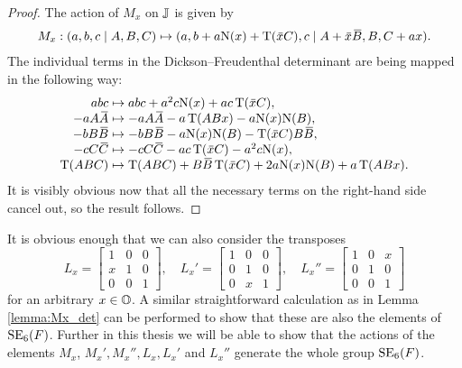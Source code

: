 \begin{proof}
	The action of $M_x$ on $\mathbb{J}$ is given by
	\begin{equation*}
		\begin{array}{r@{\;}c@{\;}l}
		M_x: (a,b,c\mid A,B,C) & \mapsto & (a,b+a\NN(x)+\Tr(\ovx C),c \mid 
										A+\ovx\ovB, B, C+ax).
		\end{array}
	\end{equation*}
	The individual terms in the Dickson--Freudenthal determinant are being mapped in
	the following way:
	\begin{equation*}
		\begin{array}{r@{\;}c@{\;}l}
			abc & \mapsto & abc + a^2c\NN(x) + ac\Tr(\ovx C), \\
			-aA\ovA & \mapsto & -aA\ovA - a\Tr(ABx) - a\NN(x)\NN(B), \\
			-bB\ovB & \mapsto & -bB\ovB - a\NN(x)\NN(B) - \Tr(\ovx C)B\ovB, \\
			-cC\ovC & \mapsto & -cC\ovC - ac\Tr(\ovx C) - a^2c\NN(x), \\
			\Tr(ABC) & \mapsto & \Tr(ABC) + B\ovB\Tr(\ovx C) + 2a\NN(x)\NN(B) + a\Tr(ABx). 
		\end{array}
	\end{equation*}
	It is visibly obvious now that all the necessary terms on the right-hand side cancel out,
	so the result follows.
\end{proof}

It is obvious enough that we can also consider the transposes 
\begin{equation}
	L_x = \begin{bmatrix}
		1 & 0 & 0 \\
		x & 1 & 0 \\
		0 & 0 & 1
	\end{bmatrix},\quad 
	L_x' = \begin{bmatrix}
		1 & 0 & 0 \\
		0 & 1 & 0 \\
		0 & x & 1 
	\end{bmatrix},\quad 
	L_x'' = \begin{bmatrix}
		1 & 0 & x \\
		0 & 1 & 0 \\
		0 & 0 & 1
	\end{bmatrix}
\end{equation}
for an arbitrary $x \in \mathbb{O}$. 
A similar straightforward calculation as in Lemma \ref{lemma:Mx_det} can be performed
to show that these are also the elements of $\mathrm{SE}_6(F)$. 
Further in this thesis we will be able to show that the actions of the elements
$M_x$, $M_x',M_x'',L_x,L_x'$ and $L_x''$ generate the whole group $\mathrm{SE}_6(F)$.

